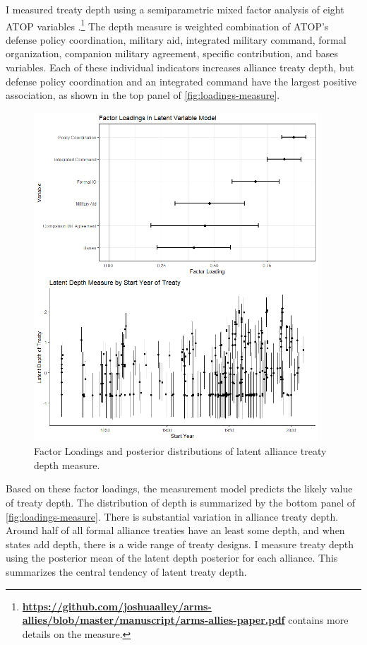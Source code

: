 \documentclass[12pt]{article}
\begin{document}
I measured treaty depth using a semiparametric mixed factor analysis of eight ATOP variables \citep{Murrayetal2013}.\footnote{\textbf{\url{https://github.com/joshuaalley/arms-allies/blob/master/manuscript/arms-allies-paper.pdf}} contains more details on the measure.}
The depth measure is weighted combination of ATOP's defense policy coordination, military aid, integrated military command, formal organization, companion military agreement, specific contribution, and bases variables. 
Each of these individual indicators increases alliance treaty depth, but defense policy coordination and an integrated command have the largest positive association, as shown in the top panel of \autoref{fig:loadings-measure}. 


\begin{figure}[hbtp]
\centering
\includegraphics[width=0.95\textwidth]{../figures/loadings-measure.png}
\caption{Factor Loadings and posterior distributions of latent alliance treaty depth measure.}
\label{fig:loadings-measure}
\end{figure}


Based on these factor loadings, the measurement model predicts the likely value of treaty depth. 
The distribution of depth is summarized by the bottom panel of \autoref{fig:loadings-measure}. 
There is substantial variation in alliance treaty depth. 
Around half of all formal alliance treaties have an least some depth, and when states add depth, there is a wide range of treaty designs.
I measure treaty depth using the posterior mean of the latent depth posterior for each alliance. 
This summarizes the central tendency of latent treaty depth. 
\end{document}
